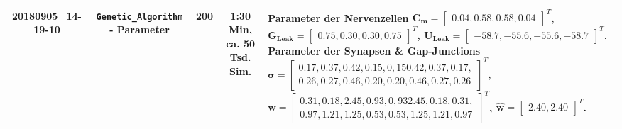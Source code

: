 {\begin{landscape}
\begin{tabular}{c@{\hskip 0.5cm}c@{\hskip 0.5cm}c@{\hskip 0.5cm}c@{\hskip 0.5cm}p{85mm}}
				20180905\_14-19-10		& \texttt{Genetic\_Algorithm} - Parameter& 200			& 1:30 Min, ca. 50 Tsd. Sim.		& Parameter der Nervenzellen \newline
				$\boldsymbol{C_m} = \begin{bmatrix}0.04, 0.58, 0.58, 0.04\end{bmatrix}^T$,\newline
				$\boldsymbol{G_{Leak}} = \begin{bmatrix}0.75, 0.30, 0.30, 0.75\end{bmatrix}^T$,\newline
				$\boldsymbol{U_{Leak}} = \begin{bmatrix}-58.7, -55.6, -55.6, -58.7\end{bmatrix}^T.$ \vspace{0.1cm} \newline
				Parameter der Synapsen \& Gap-Junctions \newline
				$\boldsymbol{\sigma} = \begin{bmatrix}0.17, 0.37, 0.42, 0.15, 0,15 0.42, 0.37, 0.17,\\ 0.26, 0.27, 0.46, 0.20, 0.20, 0.46, 0.27, 0.26\end{bmatrix}^T$,\newline
				$\boldsymbol{w} = \begin{bmatrix}0.31, 0.18, 2.45, 0.93, 0,93 2.45, 0.18, 0.31,\\ 0.97, 1.21, 1.25, 0.53, 0.53, 1.25, 1.21, 0.97\end{bmatrix}^T$,\newline
				$\boldsymbol{\hat{w}} = \begin{bmatrix}2.40, 2.40\end{bmatrix}^T$.\vspace{0.1cm}\\
				
				\bottomrule
				\hline
			\end{tabular}
			\label{tab:app_erg}
		\end{landscape}
		\clearpage%
	}
	


